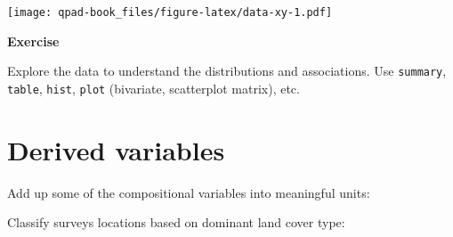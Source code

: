 \documentclass[12pt,]{book}
\newenvironment{Shaded}{\begin{snugshade}}{\end{snugshade}}
\newcommand{\CommentTok}[1]{\textcolor[rgb]{0.56,0.35,0.01}{\textit{#1}}}
\newcommand{\KeywordTok}[1]{\textcolor[rgb]{0.13,0.29,0.53}{\textbf{#1}}}
\newcommand{\NormalTok}[1]{#1}
\newcommand{\OperatorTok}[1]{\textcolor[rgb]{0.81,0.36,0.00}{\textbf{#1}}}
\newcommand{\StringTok}[1]{\textcolor[rgb]{0.31,0.60,0.02}{#1}}
\let\BeginKnitrBlock\begin \let\EndKnitrBlock\end
\begin{document}
\texttt{[image: qpad-book\_files/figure-latex/data-xy-1.pdf]}

\BeginKnitrBlock{rmdexercise}
\textbf{Exercise}

Explore the data to understand the distributions and associations.
Use \texttt{summary}, \texttt{table}, \texttt{hist}, \texttt{plot} (bivariate, scatterplot matrix), etc.
\EndKnitrBlock{rmdexercise}

\hypertarget{derived-variables}{%
\section{Derived variables}\label{derived-variables}}

Add up some of the compositional variables into meaningful units:

\begin{Shaded}
\end{Shaded}

Classify surveys locations based on dominant land cover type:

\begin{Shaded}
\end{Shaded}
\end{document}
